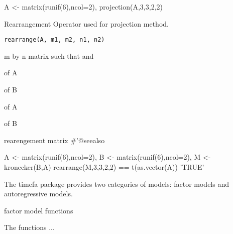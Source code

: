 \documentclass[a4paper]{book}
\begin{document}
%
\begin{Examples}
\begin{ExampleCode}
A <- matrix(runif(6),ncol=2),
projection(A,3,3,2,2)
\end{ExampleCode}
\end{Examples}
%
\begin{Description}\relax
Rearrangement Operator used for projection method.
\end{Description}
%
\begin{Usage}
\begin{verbatim}
rearrange(A, m1, m2, n1, n2)
\end{verbatim}
\end{Usage}
%
\begin{Arguments}
\begin{ldescription}
\item[\code{A}] m by n matrix such that  and 

\item[\code{m1}]  of A

\item[\code{m2}]  of B

\item[\code{n1}]  of A

\item[\code{n2}]  of B
\end{ldescription}
\end{Arguments}
%
\begin{Value}
rearengement matrix
\#'@seealso 
\end{Value}
%
\begin{Examples}
\begin{ExampleCode}
A <- matrix(runif(6),ncol=2),
B <- matrix(runif(6),ncol=2),
M <- kronecker(B,A)
rearrange(M,3,3,2,2) == t(as.vector(A)) %
'TRUE'
\end{ExampleCode}
\end{Examples}
%
\begin{Description}\relax
The timefa package provides two categories of models:
factor models and autoregressive models.
\end{Description}
%
\begin{Section}{factor model functions}

The functions ...
\end{Section}
\end{document}
